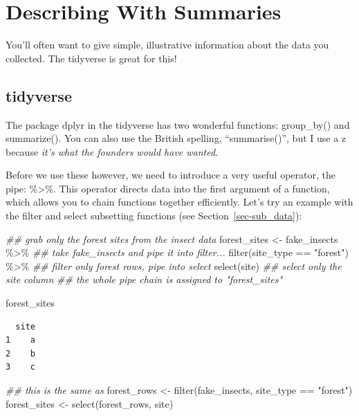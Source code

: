 \documentclass[
  letterpaper,
  DIV=11,
  numbers=noendperiod]{scrreprt}
\newenvironment{Shaded}{\begin{snugshade}}{\end{snugshade}}
\newcommand{\DocumentationTok}[1]{\textcolor[rgb]{0.37,0.37,0.37}{\textit{#1}}}
\newcommand{\FunctionTok}[1]{\textcolor[rgb]{0.28,0.35,0.67}{#1}}
\newcommand{\NormalTok}[1]{\textcolor[rgb]{0.00,0.23,0.31}{#1}}
\newcommand{\OtherTok}[1]{\textcolor[rgb]{0.00,0.23,0.31}{#1}}
\newcommand{\SpecialCharTok}[1]{\textcolor[rgb]{0.37,0.37,0.37}{#1}}
\newcommand{\StringTok}[1]{\textcolor[rgb]{0.13,0.47,0.30}{#1}}
\begin{document}
\hypertarget{describing-with-summaries}{%
\section{Describing With Summaries}\label{describing-with-summaries}}

You'll often want to give simple, illustrative information about the
data you collected. The tidyverse is great for this!

\hypertarget{tidyverse-2}{%
\subsection{tidyverse}\label{tidyverse-2}}

The package dplyr in the tidyverse has two wonderful functions:
group\_by() and summarize(). You can also use the British spelling,
``summarise()'', but I use a z because \emph{it's what the founders
would have wanted}.

Before we use these however, we need to introduce a very useful
operator, the pipe: \%\textgreater\%. This operator directs data into
the first argument of a function, which allows you to chain functions
together efficiently. Let's try an example with the filter and select
subsetting functions (see Section~\ref{sec-sub_data}):

\begin{Shaded}
\begin{Highlighting}[]
\DocumentationTok{\#\# grab only the forest sites from the insect data}
\NormalTok{forest\_sites }\OtherTok{\textless{}{-}}\NormalTok{ fake\_insects }\SpecialCharTok{\%\textgreater{}\%} \DocumentationTok{\#\# take fake\_insects and pipe it into filter...}
  \FunctionTok{filter}\NormalTok{(site\_type }\SpecialCharTok{==} \StringTok{"forest"}\NormalTok{) }\SpecialCharTok{\%\textgreater{}\%} \DocumentationTok{\#\# filter only forest rows, pipe into select}
  \FunctionTok{select}\NormalTok{(site) }\DocumentationTok{\#\# select only the site column}
\DocumentationTok{\#\# the whole pipe chain is assigned to "forest\_sites"}

\NormalTok{forest\_sites}
\end{Highlighting}
\end{Shaded}

\begin{verbatim}
  site
1    a
2    b
3    c
\end{verbatim}

\begin{Shaded}
\begin{Highlighting}[]
\DocumentationTok{\#\# this is the same as}
\NormalTok{forest\_rows }\OtherTok{\textless{}{-}} \FunctionTok{filter}\NormalTok{(fake\_insects, site\_type }\SpecialCharTok{==} \StringTok{"forest"}\NormalTok{)}
\NormalTok{forest\_sites }\OtherTok{\textless{}{-}} \FunctionTok{select}\NormalTok{(forest\_rows, site)}
\end{Highlighting}
\end{Shaded}
\end{document}

